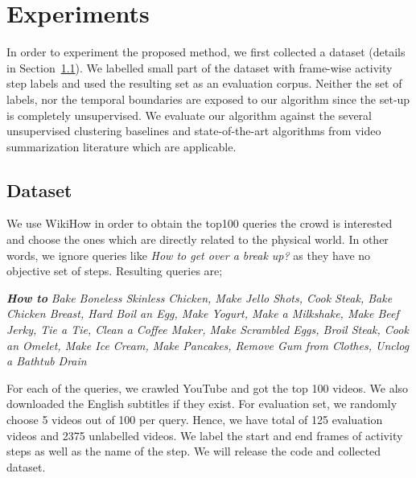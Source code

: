 \section{Experiments}
In order to experiment the proposed method, we first collected a dataset (details in Section~\ref{dataset:sec}). We labelled small part of the dataset with frame-wise activity step labels and used the resulting set as an evaluation corpus. Neither the set of labels, nor the temporal boundaries are exposed to our algorithm since the set-up is completely unsupervised. We evaluate our algorithm against the several unsupervised clustering baselines and state-of-the-art algorithms from video summarization literature which are applicable.
\subsection{Dataset}
\label{dataset:sec}
We use WikiHow\cite{wikiHow} in order to obtain the top100 queries the crowd is interested and choose the ones which are directly related to the physical world. In other words, we ignore queries like \emph{How to get over a break up‏?‎} as they have no objective set of steps. Resulting queries are;


\emph{\textbf{How to}}\footnotesize
\emph{Bake Boneless Skinless Chicken, Make Jello Shots, Cook Steak, Bake Chicken Breast, Hard Boil an Egg, Make Yogurt, Make a Milkshake, Make Beef Jerky, Tie a Tie, Clean a Coffee Maker, Make Scrambled Eggs, Broil Steak, Cook an Omelet, Make Ice Cream, Make Pancakes, Remove Gum from Clothes, Unclog a Bathtub Drain}
\normalsize

For each of the queries, we crawled YouTube and got the top 100 videos. We also downloaded the English subtitles if they exist. For evaluation set, we randomly choose 5 videos out of 100 per query. Hence, we have total of 125 evaluation videos and 2375 unlabelled videos. We label the start and end frames of activity steps as well as the name of the step. We will release the code and collected dataset.

